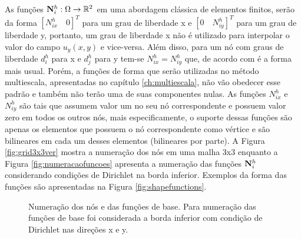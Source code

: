 As funções ${\mathbf{N}_{i}^h}: \Omega \rightarrow \mathbb{R}^2$ em uma abordagem clássica de elementos finitos, serão da forma $[N^h_{ix} \quad 0]^T$ para um grau de liberdade x e  $[0 \quad N^h_{iy}]^T$  para um grau de liberdade y, portanto, um grau de liberdade x não é utilizado para interpolar o valor do campo $u_y(x, y)$ e vice-versa. Além disso, para um nó com  graus de liberdade $d^h_i$ para x e $d^h_j$ para y tem-se $N^h_{ix} = N^h_{iy}$ que, de acordo com \cite{jacob} é a forma mais usual. Porém, a funções de forma que serão utilizadas no método multiescala, apresentadas no capítulo \ref{ch:multiescala}, não vão obedecer esse padrão e também não terão uma de suas componentes nulas. As funções $N^h_{ix}$ e $N^h_{iy}$ são tais que assumem valor um no seu nó correspondente e possuem valor zero em todos os outros nós, mais especificamente, o suporte dessas funções são apenas os elementos que possuem o nó correspondente como vértice e são bilineares em cada um desses elementos (bilineares por parte). A Figura \ref{fig:grid3x3ver} mostra a numeração dos nós em uma malha 3x3 enquanto a Figura \ref{fig:numeracaofuncoes} apresenta a numeração das funções ${\mathbf{N}_{i}^h}$ considerando condições de Dirichlet na borda inferior.
Exemplos da forma das funções são apresentadas na Figura \ref{fig:shapefunctions}.


\begin{figure}[h]
\center
{}
\qquad
{}

\caption{Numeração dos nós e das funções de base. Para numeração das funções de base foi considerada a borda inferior com condição de Dirichlet nas direções x e y. }
\end{figure}



